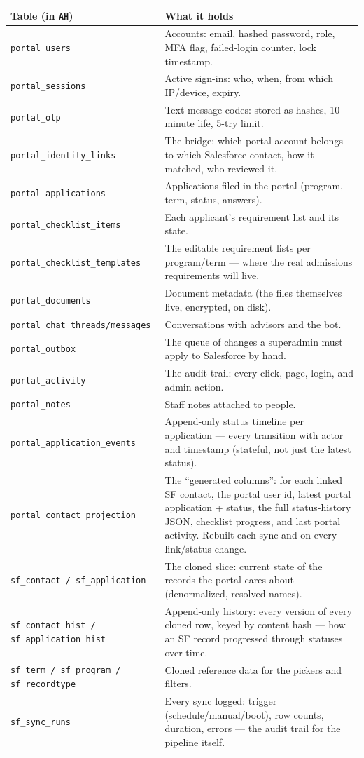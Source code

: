 \documentclass[11pt,letterpaper]{report}
\begin{document}
\begin{center}
\begin{tabularx}{\textwidth}{lX}
\toprule
\textbf{Table (in \texttt{AH})} & \textbf{What it holds} \\
\midrule
\texttt{portal\_users} & Accounts: email, hashed password, role, MFA flag,
failed-login counter, lock timestamp. \\
\texttt{portal\_sessions} & Active sign-ins: who, when, from which IP/device,
expiry. \\
\texttt{portal\_otp} & Text-message codes: stored as hashes, 10-minute life,
5-try limit. \\
\texttt{portal\_identity\_links} & The bridge: which portal account belongs to
which Salesforce contact, how it matched, who reviewed it. \\
\texttt{portal\_applications} & Applications filed in the portal (program, term,
status, answers). \\
\texttt{portal\_checklist\_items} & Each applicant's requirement list and its
state. \\
\texttt{portal\_checklist\_templates} & The editable requirement lists per
program/term --- where the real admissions requirements will live. \\
\texttt{portal\_documents} & Document metadata (the files themselves live,
encrypted, on disk). \\
\texttt{portal\_chat\_threads/messages} & Conversations with advisors and the bot. \\
\texttt{portal\_outbox} & The queue of changes a superadmin must apply to
Salesforce by hand. \\
\texttt{portal\_activity} & The audit trail: every click, page, login, and admin
action. \\
\texttt{portal\_notes} & Staff notes attached to people. \\
\texttt{portal\_application\_events} & Append-only status timeline per
application --- every transition with actor and timestamp (stateful, not just
the latest status). \\
\texttt{portal\_contact\_projection} & The ``generated columns'': for each
linked SF contact, the portal user id, latest portal application + status,
the full status-history JSON, checklist progress, and last portal activity.
Rebuilt each sync and on every link/status change. \\
\texttt{sf\_contact / sf\_application} & The cloned slice: current state of
the records the portal cares about (denormalized, resolved names). \\
\texttt{sf\_contact\_hist / sf\_application\_hist} & Append-only history: every
version of every cloned row, keyed by content hash --- how an SF record
progressed through statuses over time. \\
\texttt{sf\_term / sf\_program / sf\_recordtype} & Cloned reference data for
the pickers and filters. \\
\texttt{sf\_sync\_runs} & Every sync logged: trigger (schedule/manual/boot),
row counts, duration, errors --- the audit trail for the pipeline itself. \\
\bottomrule
\end{tabularx}
\end{center}
\end{document}
